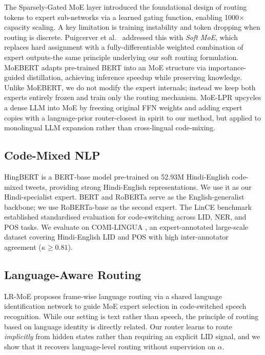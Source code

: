 \documentclass[conference]{IEEEtran}
\begin{document}
The Sparsely-Gated MoE layer \cite{shazeer2017moe} introduced the foundational design of routing tokens to expert sub-networks via a learned gating function, enabling 1000$\times$ capacity scaling. A key limitation is training instability and token dropping when routing is discrete. Puigcerver et al.\ \cite{puigcerver2024softmoe} addressed this with \emph{Soft MoE}, which replaces hard assignment with a fully-differentiable weighted combination of expert outputs-the same principle underlying our soft routing formulation. MoEBERT \cite{zuo2022moebert} adapts pre-trained BERT into an MoE structure via importance-guided distillation, achieving inference speedup while preserving knowledge. Unlike MoEBERT, we do not modify the expert internals; instead we keep both experts entirely frozen and train only the routing mechanism. MoE-LPR \cite{zhou2024moelpr} upcycles a dense LLM into MoE by freezing original FFN weights and adding expert copies with a language-prior router-closest in spirit to our method, but applied to monolingual LLM expansion rather than cross-lingual code-mixing.

\subsection{Code-Mixed NLP}

HingBERT \cite{nayak2022hingbert} is a BERT-base model pre-trained on 52.93M Hindi-English code-mixed tweets, providing strong Hindi-English representations. We use it as our Hindi-specialist expert. BERT \cite{devlin2019bert} and RoBERTa \cite{liu2019roberta} serve as the English-generalist backbone; we use RoBERTa-base as the second expert. The LinCE benchmark \cite{aguilar2020lince} established standardised evaluation for code-switching across LID, NER, and POS tasks. We evaluate on COMI-LINGUA \cite{sheth2024comilingua}, an expert-annotated large-scale dataset covering Hindi-English LID and POS with high inter-annotator agreement ($\kappa \geq 0.81$).

\subsection{Language-Aware Routing}

LR-MoE \cite{wang2023lrmoe} proposes frame-wise language routing via a shared language identification network to guide MoE expert selection in code-switched speech recognition. While our setting is text rather than speech, the principle of routing based on language identity is directly related. Our router learns to route \emph{implicitly} from hidden states rather than requiring an explicit LID signal, and we show that it recovers language-level routing without supervision on $\alpha$.
\end{document}
